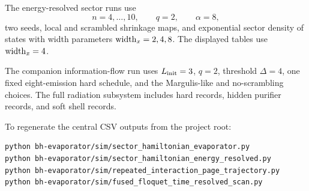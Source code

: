 \documentclass[aps,prd,onecolumn,longbibliography,nofootinbib]{revtex4-2}
\begin{document}
The energy-resolved sector runs use
\begin{equation}
    n=4,\ldots,10,\qquad q=2,\qquad \alpha=8,
\end{equation}
two seeds, local and scrambled shrinkage maps, and exponential sector density
of states with width parameters ${\rm width}_x=2,4,8$.  The displayed tables
use ${\rm width}_x=4$.

The companion information-flow run uses $L_{\rm init}=3$, $q=2$, threshold
$\Delta=4$, one fixed eight-emission hard schedule, and the Margulis-like and
no-scrambling choices.  The full radiation subsystem includes hard records,
hidden purifier records, and soft shell records.

To regenerate the central CSV outputs from the project root:
\begin{verbatim}
python bh-evaporator/sim/sector_hamiltonian_evaporator.py
python bh-evaporator/sim/sector_hamiltonian_energy_resolved.py
python bh-evaporator/sim/repeated_interaction_page_trajectory.py
python bh-evaporator/sim/fused_floquet_time_resolved_scan.py
\end{verbatim}



\end{document}
